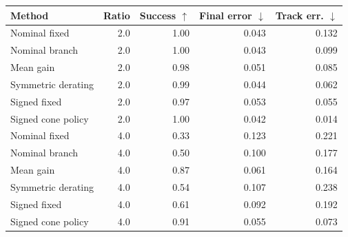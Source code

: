 \begin{tabular}{lrrrr}
\toprule
Method & Ratio & Success $\uparrow$ & Final error $\downarrow$ & Track err. $\downarrow$ \\
\midrule
Nominal fixed & 2.0 & 1.00 & 0.043 & 0.132 \\
Nominal branch & 2.0 & 1.00 & 0.043 & 0.099 \\
Mean gain & 2.0 & 0.98 & 0.051 & 0.085 \\
Symmetric derating & 2.0 & 0.99 & 0.044 & 0.062 \\
Signed fixed & 2.0 & 0.97 & 0.053 & 0.055 \\
Signed cone policy & 2.0 & 1.00 & 0.042 & 0.014 \\
Nominal fixed & 4.0 & 0.33 & 0.123 & 0.221 \\
Nominal branch & 4.0 & 0.50 & 0.100 & 0.177 \\
Mean gain & 4.0 & 0.87 & 0.061 & 0.164 \\
Symmetric derating & 4.0 & 0.54 & 0.107 & 0.238 \\
Signed fixed & 4.0 & 0.61 & 0.092 & 0.192 \\
Signed cone policy & 4.0 & 0.91 & 0.055 & 0.073 \\
\bottomrule
\end{tabular}
